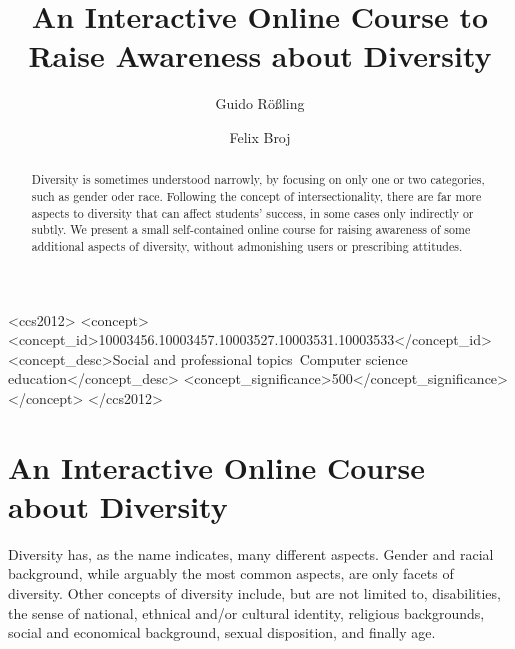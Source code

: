 \documentclass[sigconf,anonymous]{acmart}
\begin{document}

\title{An Interactive Online Course to Raise Awareness about Diversity}

\author{Guido R\"o\ss{}ling}
\author{Felix Broj}
\begin{CCSXML}
<ccs2012>
<concept>
<concept_id>10003456.10003457.10003527.10003531.10003533</concept_id>
<concept_desc>Social and professional topics~Computer science education</concept_desc>
<concept_significance>500</concept_significance>
</concept>
</ccs2012>
\end{CCSXML}


\begin{abstract}
Diversity is sometimes understood narrowly, by focusing on only one or two categories,
such as gender oder race. Following the concept of intersectionality, there are far more
aspects to diversity that can affect students' success, in some cases only indirectly or
subtly. We present a small self-contained online course for raising awareness of
some additional aspects of diversity, without admonishing users or prescribing attitudes.
\end{abstract}

\maketitle

\section{An Interactive Online Course about Diversity}

Diversity has, as the name indicates, many different aspects. Gender and racial
background, while arguably the most common aspects, are only facets of diversity. Other
concepts of diversity include, but are not limited to, disabilities, the sense of
national, ethnical and/or cultural identity, religious backgrounds, social and economical
background, sexual disposition, and finally age.
\end{document}
